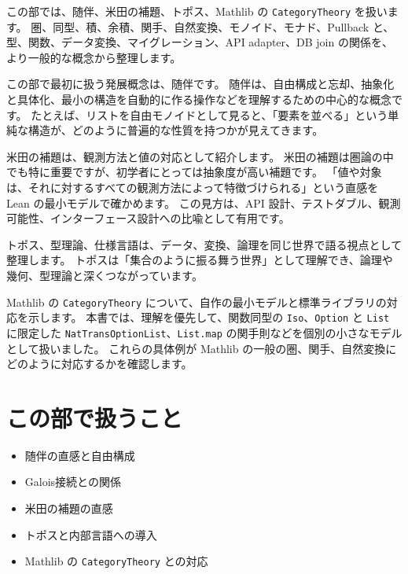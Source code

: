 
\enlargethispage{6\baselineskip}

この部では、随伴、米田の補題、トポス、Mathlib の \texttt{CategoryTheory} を扱います。
圏、同型、積、余積、関手、自然変換、モノイド、モナド、Pullback と、型、関数、データ変換、マイグレーション、API adapter、DB join の関係を、より一般的な概念から整理します。

この部で最初に扱う発展概念は、随伴です。
随伴は、自由構成と忘却、抽象化と具体化、最小の構造を自動的に作る操作などを理解するための中心的な概念です。
たとえば、リストを自由モノイドとして見ると、「要素を並べる」という単純な構造が、どのように普遍的な性質を持つかが見えてきます。

米田の補題は、観測方法と値の対応として紹介します。
米田の補題は圏論の中でも特に重要ですが、初学者にとっては抽象度が高い補題です。
「値や対象は、それに対するすべての観測方法によって特徴づけられる」という直感を Lean の最小モデルで確かめます。
この見方は、API 設計、テストダブル、観測可能性、インターフェース設計への比喩として有用です。

トポス、型理論、仕様言語は、データ、変換、論理を同じ世界で語る視点として整理します。
トポスは「集合のように振る舞う世界」として理解でき、論理や幾何、型理論と深くつながっています。

Mathlib の \texttt{CategoryTheory} について、自作の最小モデルと標準ライブラリの対応を示します。
本書では、理解を優先して、関数同型の \texttt{Iso}、\texttt{Option} と \texttt{List} に限定した \texttt{NatTransOptionList}、\texttt{List.map} の関手則などを個別の小さなモデルとして扱いました。
これらの具体例が Mathlib の一般の圏、関手、自然変換にどのように対応するかを確認します。

\section*{この部で扱うこと}

\begin{itemize}
\item 随伴の直感と自由構成
\item Galois接続との関係
\item 米田の補題の直感
\item トポスと内部言語への導入
\item Mathlib の \texttt{CategoryTheory} との対応
\end{itemize}
